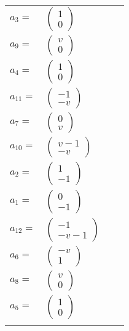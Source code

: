 \documentclass[1p]{elsarticle_modified}
\theoremstyle{definition}
\begin{document}
\begin{tabular}{m{7pt} m{180pt} m{7pt} m{180pt} }
\flushright $a_{3}=$&$\begin{pmatrix}1\\0\end{pmatrix}$ \\
\flushright $a_{9}=$&$\begin{pmatrix}v\\0\end{pmatrix}$ \\
\flushright $a_{4}=$&$\begin{pmatrix}1\\0\end{pmatrix}$ \\
\flushright $a_{11}=$&$\begin{pmatrix}-1\\- v\end{pmatrix}$ \\
\flushright $a_{7}=$&$\begin{pmatrix}0\\v\end{pmatrix}$ \\
\flushright $a_{10}=$&$\begin{pmatrix}v-1\\- v\end{pmatrix}$ \\
\flushright $a_{2}=$&$\begin{pmatrix}1\\-1\end{pmatrix}$ \\
\flushright $a_{1}=$&$\begin{pmatrix}0\\-1\end{pmatrix}$ \\
\flushright $a_{12}=$&$\begin{pmatrix}-1\\- v-1\end{pmatrix}$ \\
\flushright $a_{6}=$&$\begin{pmatrix}- v\\1\end{pmatrix}$ \\
\flushright $a_{8}=$&$\begin{pmatrix}v\\0\end{pmatrix}$ \\
\flushright $a_{5}=$&$\begin{pmatrix}1\\0\end{pmatrix}$\\&\end{tabular}
\end{document}
